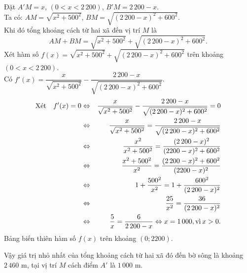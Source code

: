 \begin{ex}
{\begin{center}
        \end{center}
        Đặt $A'M=x$, $(0<x<2\,200)$,  $B'M=2\,200-x$.\\
        Ta có: $AM=\sqrt{x^2+500^2}$, $BM=\sqrt{(2\,200-x)^2+600^2}$.\\
        Khi đó tổng khoảng cách từ hai xã đến vị trí $M$ là
        \[AM+BM= \sqrt{x^2+500^2}+\sqrt{(2\,200-x)^2+600^2}.\]
        Xét hàm số $f(x)= \sqrt{x^2+500^2}+\sqrt{(2\,200-x)^2+600^2}$ trên khoảng $(0<x<2\,200)$.\\ 
        Có $f'(x)=\dfrac{x}{\sqrt{x^2+500^2}}-\dfrac{2\,200-x}{\sqrt{(2\,200-x)^2+600^2}}$.
        \begin{eqnarray*}
            \text{Xét}\quad f'(x)=0&\Leftrightarrow & \dfrac{x}{\sqrt{x^2+500^2}}-\dfrac{2\,200-x}{\sqrt{(2\,200-x)^2+600^2}}=0\\
            &\Leftrightarrow & \dfrac{x}{\sqrt{x^2+500^2}}=\dfrac{2\,200-x}{\sqrt{(2\,200-x)^2+600^2}}\\
            &\Leftrightarrow & \dfrac{x^2}{x^2+500^2}=\dfrac{(2\,200-x)^2}{(2200-x)^2+600^2}\\
            &\Leftrightarrow &\dfrac{x^2+500^2}{x^2}=\dfrac{(2\,200-x)^2+600^2}{(2200-x)^2}\\
            &\Leftrightarrow &  1+\dfrac{500^2}{x^2}=1+\dfrac{600^2}{(2\,200-x)^2}\\
            &\Leftrightarrow &  \dfrac{25}{x^2}=\dfrac{36}{(2\,200-x)^2}\\
            &\Leftrightarrow &\dfrac{5}{x}=\dfrac{6}{2\,200-x} \Leftrightarrow x=1\,000,  \text{vì}\hspace{.2em} x>0.
        \end{eqnarray*}
        Bảng biến thiên hàm số $f(x)$ trên khoảng $\left( 0;2200\right)$.
        \begin{center}
        \end{center}
        Vậy giá trị nhỏ nhất của tổng khoảng cách từ hai xã đó đến bờ sông là khoảng $2\,460 $ m, tại vị trí $M$ cách điểm $A'$  là $1\,000$ m.
    }
\end{ex}

